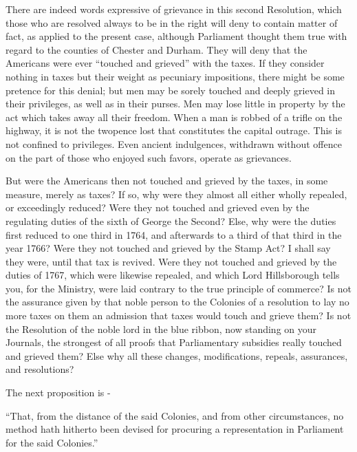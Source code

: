 There are indeed words expressive of grievance in this second Resolution, which those who are resolved always to be in the right will deny to contain matter of fact, as applied to the present case, although Parliament thought them true with regard to the counties of Chester and Durham. They will deny that the Americans were ever “touched and grieved” with the taxes. If they consider nothing in taxes but their weight as pecuniary impositions, there might be some pretence for this denial; but men may be sorely touched and deeply grieved in their privileges, as well as in their purses. Men may lose little in property by the act which takes away all their freedom. When a man is robbed of a trifle on the highway, it is not the twopence lost that constitutes the capital outrage. This is not confined to privileges. Even ancient indulgences, withdrawn without offence on the part of those who enjoyed such favors, operate as grievances.\par

But were the Americans then not touched and grieved by the taxes, in some measure, merely as taxes? If so, why were they almost all either wholly repealed, or exceedingly reduced? Were they not touched and grieved even by the regulating duties of the sixth of George the Second? Else, why were the duties first reduced to one third in 1764, and afterwards to a third of that third in the year 1766? Were they not touched and grieved by the Stamp Act? I shall say they were, until that tax is revived. Were they not touched and grieved by the duties of 1767, which were likewise repealed, and which Lord Hillsborough tells you, for the Ministry, were laid contrary to the true principle of commerce? Is not the assurance given by that noble person to the Colonies of a resolution to lay no more taxes on them an admission that taxes would touch and grieve them? Is not the Resolution of the noble lord in the blue ribbon, now standing on your Journals, the strongest of all proofs that Parliamentary subsidies really touched and grieved them? Else why all these changes, modifications, repeals, assurances, and resolutions?\par

The next proposition is -\par

“That, from the distance of the said Colonies, and from other circumstances, no method hath hitherto been devised for procuring a representation in Parliament for the said Colonies.”\par

